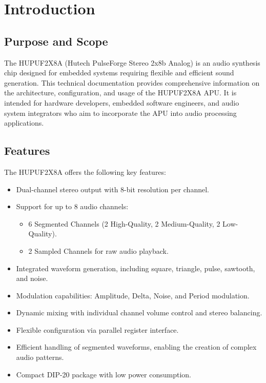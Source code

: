 \section{Introduction}

\subsection{Purpose and Scope}

The HUPUF2X8A (Hutech PulseForge Stereo 2x8b Analog) is an audio synthesis chip designed for embedded systems requiring flexible and efficient sound generation.
This technical documentation provides comprehensive information on the architecture, configuration, and usage of the HUPUF2X8A APU.
It is intended for hardware developers, embedded software engineers, and audio system integrators who aim to incorporate the APU into audio processing applications.

\subsection{Features}

The HUPUF2X8A offers the following key features:
\begin{itemize}
    \item Dual-channel stereo output with 8-bit resolution per channel.
    \item Support for up to 8 audio channels:
    \begin{itemize}
        \item 6 Segmented Channels (2 High-Quality, 2 Medium-Quality, 2 Low-Quality).
        \item 2 Sampled Channels for raw audio playback.
    \end{itemize}
    \item Integrated waveform generation, including square, triangle, pulse, sawtooth, and noise.
    \item Modulation capabilities: Amplitude, Delta, Noise, and Period modulation.
    \item Dynamic mixing with individual channel volume control and stereo balancing.
    \item Flexible configuration via parallel register interface.
    \item Efficient handling of segmented waveforms, enabling the creation of complex audio patterns.
    \item Compact DIP-20 package with low power consumption.
\end{itemize}

